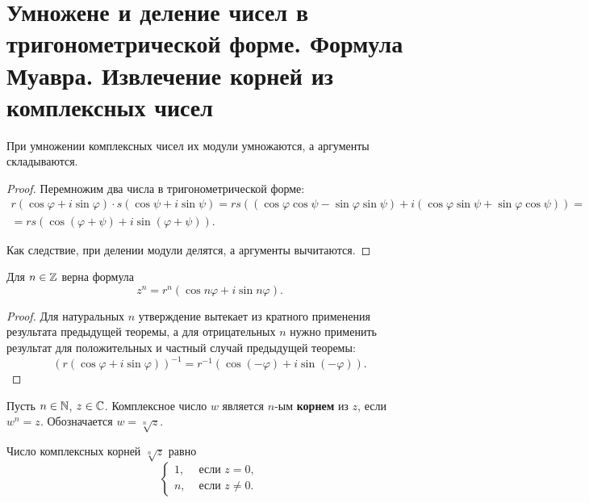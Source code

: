 \section{Умножене и деление чисел в тригонометрической форме. Формула Муавра. Извлечение корней из комплексных чисел}

\begin{theorem}
    При умножении комплексных чисел их модули умножаются, а аргументы складываются.
\end{theorem}

\begin{proof}
    Перемножим два числа в тригонометрической форме:
    $$
    \begin{array}{c}
        r(\cos\varphi + i\sin\varphi) \cdot s (\cos\psi + i\sin\psi) = rs((\cos\varphi\cos\psi - \sin\varphi\sin\psi) + i(\cos\varphi\sin\psi + \sin\varphi\cos\psi)) =\\\displaystyle = rs(\cos(\varphi + \psi) + i\sin(\varphi + \psi)).
    \end{array}
    $$

    Как следствие, при делении модули делятся, а аргументы вычитаются.
\end{proof}

\begin{theorem}
    Для $n \in \mathbb{Z}$ верна формула
    $$
    z^n = r^n(\cos n\varphi + i\sin n\varphi).
    $$
\end{theorem}

\begin{proof}
    Для натуральных $n$ утверждение вытекает из кратного применения результата предыдущей теоремы, а для отрицательных $n$ нужно применить результат для положительных и частный случай предыдущей теоремы:
    $$
    (r(\cos\varphi + i\sin\varphi))^{-1} = r^{-1}(\cos(-\varphi) + i\sin(-\varphi)).
    $$
\end{proof}

\begin{definition}
    Пусть $n \in \mathbb{N}$, $z \in \mathbb{C}$. Комплексное число $w$ является $n$-ым \textbf{корнем} из $z$, если $w^n = z$. Обозначается $w = \sqrt[n]{z}$.
\end{definition}

\begin{theorem}
    Число комплексных корней $\sqrt[n]{z}$ равно
    $$
    \begin{cases}
        1,&\text{ если $z = 0$},\\
        n,&\text{ если $z \ne 0$}.
    \end{cases}
    $$
\end{theorem}

